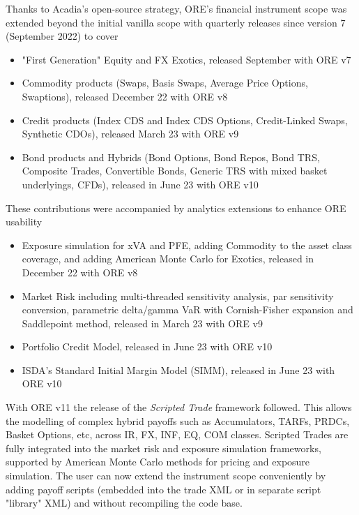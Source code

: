 \documentclass[12pt, a4paper]{article}
\begin{document}
\medskip
Thanks to Acadia's open-source strategy, ORE's financial instrument scope was extended beyond the initial vanilla scope with quarterly releases since version 7 (September 2022) to cover
\begin{itemize}
\item "First Generation" Equity and FX Exotics, released September with ORE v7
\item Commodity products (Swaps, Basis Swaps, Average Price Options, Swaptions), released December 22 with ORE v8
\item Credit products (Index CDS and Index CDS Options, Credit-Linked Swaps, Synthetic CDOs), released March 23 with ORE v9
\item Bond products and Hybrids (Bond Options, Bond Repos, Bond TRS, Composite Trades, Convertible Bonds, Generic TRS with mixed basket underlyings, CFDs), released in June 23 with ORE v10
\end{itemize}
These contributions were accompanied by analytics extensions to enhance ORE usability
\begin{itemize}
\item Exposure simulation for xVA and PFE, adding Commodity to the asset class coverage, and adding American Monte Carlo for Exotics, released in December 22 with ORE v8
\item Market Risk including multi-threaded sensitivity analysis, par sensitivity conversion, parametric delta/gamma VaR with Cornish-Fisher expansion and Saddlepoint method, released in March 23 with ORE v9
\item Portfolio Credit Model, released in June 23 with ORE v10
\item ISDA's Standard Initial Margin Model (SIMM), released in June 23 with ORE v10
\end{itemize}

With ORE v11 the release of the {\em Scripted Trade} framework followed. This allows the modelling of complex hybrid payoffs such as Accumulators, TARFs, PRDCs, Basket Options, etc, across IR, FX, INF, EQ, COM classes.  Scripted Trades are fully integrated into the market risk and exposure simulation frameworks, supported by American Monte Carlo methods for pricing and exposure simulation. 
The user can now extend the instrument scope conveniently by adding payoff scripts (embedded into the trade XML or in separate script "library" XML) and without recompiling the code base.
\end{document}
